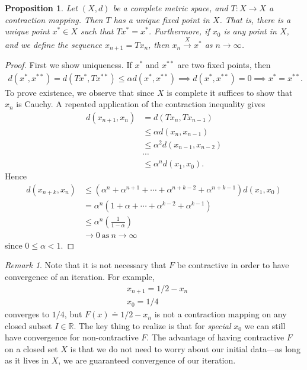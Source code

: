 \documentclass[12pt]{article}
\newcommand{\rr}{\mathbb{R}}
\theoremstyle{plain}
\newtheorem{proposition}[theorem]{Proposition}
\theoremstyle{definition}
\theoremstyle{remark}
\newtheorem*{remark}{Remark}
\numberwithin{equation}{section}  %
\begin{document}
\begin{proposition}
	\label{lem:fixed-point}
	Let $(X,d)$ be a complete metric space, and $T: X \to X$ a contraction
	mapping. Then $T$ has a unique fixed point in $X$. That is, there is a unique
	point $x^* \in X$ such that $Tx^* = x^*$. Furthermore, if $x_0$ is any point
	in $X$, and we define the sequence $x_{n+1} = Tx_n$, then $x_n \xrightarrow{X} x^*$ as $n
	\to \infty$.
\end{proposition}
\begin{proof} First we show uniqueness. If $x^*$ and $x^{**}$ are two fixed
	points, then
	\begin{equation*}
		\begin{split}
			d(x^*, x^{**}) = d(Tx^*, Tx^{**}) \le \alpha d(x^*, x^{**}) \implies d(x^*,
			x^{**}) = 0 \implies x^* = x^{**}.
		\end{split}
	\end{equation*}
	To prove existence, we observe that since $X$ is complete it suffices to show
	that $x_n$ is Cauchy. A repeated application of the
	contraction inequality gives
	\begin{equation*}
		\begin{split}
			d\left( x_{n+1},x_n \right)
			& = d\left( Tx_n, Tx_{n-1} \right)
			\\
			& \le \alpha d\left( x_n, x_{n-1} \right)
			\\
			& \le \alpha^2 d\left( x_{n-1}, x_{n-2} \right)
			\\
			& \cdots
			\\
			& \le \alpha^n d\left( x_1, x_0 \right).
		\end{split}
	\end{equation*}
	Hence
	\begin{equation*}
		\begin{split}
			d\left( x_{n+k},x_n \right)
			& \le (\alpha^{n } +\alpha^{n+1} + \cdots +
			\alpha^{n+k-2} + \alpha^{n+k-1})d(x_{1}, x_{0}) 
			\\
			& = \alpha^{n}(1 + \alpha + \cdots + \alpha^{k-2} + \alpha^{k-1})
			\\
			& \le \alpha^{n}\left( \frac{1}{1 - \alpha} \right)
			\\
			& \to 0 \ \text{as} \ n \to \infty
		\end{split}
	\end{equation*}
	since $0 \le \alpha < 1$. 
\end{proof}
\begin{remark}
	Note that it is not necessary that $F$ be contractive in order to 
	have convergence of an iteration. For example,
	\begin{align*}
		& x_{n+1} = 1/2 - x_n
		\\
		& x_0 = 1/4
	\end{align*}
	converges to $1/4$, but $F(x) \doteq 1/2 - x_n$ is not a contraction mapping
	on any closed subset $I \in \rr$. The key thing to realize is that
	for \emph{special} $x_0$ we can still have convergence for non-contractive $F$.
	The advantage of having contractive $F$ on a closed set $X$ is that we do not need to worry
	about our initial data---as long as it lives in $X$,
	we are guaranteed convergence of our iteration.
\end{remark}
\end{document}
